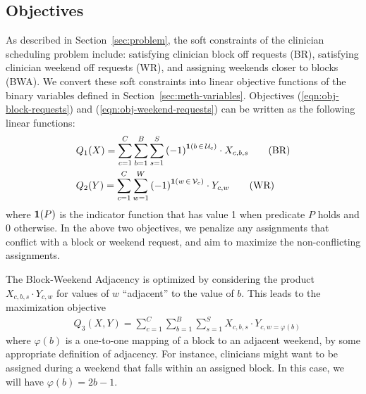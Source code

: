 \subsection{Objectives}\label{sec:meth-objectives}
As described in Section~\ref{sec:problem}, the soft constraints of the clinician
scheduling problem include: satisfying clinician block off requests (BR),
satisfying clinician weekend off requests (WR), and assigning weekends closer to
blocks (BWA). We convert these soft constraints into linear objective functions
of the binary variables defined in Section~\ref{sec:meth-variables}. Objectives
(\ref{eqn:obj-block-requests}) and (\ref{eqn:obj-weekend-requests}) can be
written as the following linear functions:  %
\begin{align}
&Q_1(X) = \sum_{c=1}^{C} \sum_{b=1}^{B} \sum_{s=1}^{S}
{(-1)}^{\bm{1}(b\,\in\,\mathcal{U}_c)}\cdot X_{c, b, s} \tag{BR}
\label{eqn:obj-block-requests}\\
&Q_2(Y) = \sum_{c=1}^{C} \sum_{w=1}^{W}
{(-1)}^{\bm{1}(w\,\in\,\mathcal{V}_c)}\cdot Y_{c, w} \tag{WR}
\label{eqn:obj-weekend-requests}
\end{align}
where $\bm{1}(P)$ is the indicator function that has value 1 when predicate $P$
holds and 0 otherwise. In the above two objectives, we penalize any assignments
that conflict with a block or weekend request, and aim to maximize the
non-conflicting assignments.

The Block-Weekend Adjacency is optimized by considering the product $X_{c, b,
	s}\cdot Y_{c, w}$ for values of $w$ ``adjacent'' to the value of $b$. This
leads
to the maximization objective %
\begin{align}
&Q_3(X, Y) = \sum_{c=1}^{C} \sum_{b=1}^{B} \sum_{s=1}^{S} X_{c, b, s}\cdot Y_{c,
	w=\varphi(b)} \tag{BWA} \label{eqn:obj-block-weekend-adj}
\end{align}
where $\varphi(b)$ is a one-to-one mapping of a block to an adjacent weekend, by
some appropriate definition of adjacency. For instance, clinicians might want to
be assigned during a weekend that falls within an assigned block. In this case,
we will have $\varphi(b) = 2b-1$.



